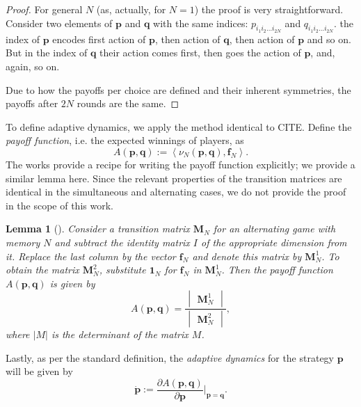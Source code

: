 \documentclass{article}
\def\p{\mathbf{p}}
\def\Mb{\mathbf{M}}
\def\q{\mathbf{q}}
\def\f{\mathbf{f}}
\newtheorem{lemma}[theorem]{Lemma}
\theoremstyle{definition}
\numberwithin{equation}{section}
\begin{document}
\begin{proof}
    For general $N$ (as, actually, for $N=1$) the proof is very straightforward. Consider two elements of $\p$ and $\q$ with the same indices: $p_{i_1i_2\ldots i_{2N}}$ and $q_{i_1i_2\ldots i_{2N}}$.  the index of $\p$ encodes first action of $\p$, then action of $\q$, then action of $\p$ and so on.  But in the index of $\q$ their action comes first, then goes the action of $\p$, and, again, so on. 

    Due to how the payoffs per choice are defined and their inherent symmetries, the payoffs after $2N$ rounds are the same. 
\end{proof}

To define adaptive dynamics, we apply the method identical to CITE. Define the \textit{payoff function}, i.e. the expected winnings of players, as 
\begin{equation}
    \label{eq: defining payoff function}
    A(\p,\q) := \left<\nu_N(\p,\q), \f_N\right>. 
\end{equation}
The works \cite{hilbe2017memory, laporte2023adaptive, balabanova2024adaptive} provide a recipe for writing the payoff function explicitly; we provide a similar lemma here. Since the relevant properties of the transition matrices are identical in the simultaneous and alternating cases, we do not provide the proof in the scope of this work. 

\begin{lemma}[\cite{hilbe2017memory}]
\label{st: payoff function}
Consider a transition matrix $\mathbf{M}_N$ for an alternating game with memory $N$ and subtract the identity matrix $I$ of the appropriate dimension from it. Replace the last column by the vector  $\mathbf{f}_N$ and denote this matrix by $\Mb_N^1$. To obtain the matrix $\Mb_N^2$, substitute $\mathbf{1}_N$ for $\mathbf{f}_N$ in $\Mb_N^1$.  Then the payoff function $A(\p,\q)$ is given by 
\begin{equation}
    \label{eq:payoff function}
A(\mathbf{p},\mathbf{q}) = \frac{\begin{vmatrix}\Mb_N^1\end{vmatrix}}{\begin{vmatrix}\Mb_N^2\end{vmatrix}}, 
\end{equation}
where $|M|$ is the determinant of the matrix $M$.
\end{lemma}
Lastly, as per the standard definition, the \textit{adaptive dynamics} for the strategy $\p$ will be given by 
\[
\dot{\p}:=\frac{\partial A(\p,\q)}{\partial \p}\Big\vert_{\p=\q}.
\]
\end{document}

